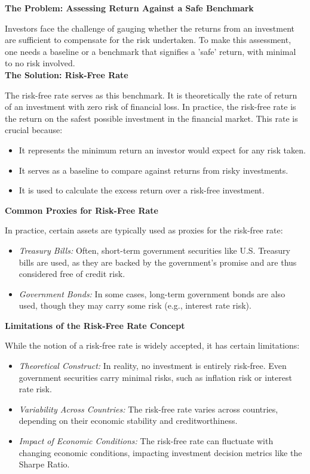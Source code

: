 \documentclass{article}
\begin{document}
\textbf{The Problem: Assessing Return Against a Safe Benchmark}

Investors face the challenge of gauging whether the returns from an investment are sufficient to compensate for the risk undertaken. To make this assessment, one needs a baseline or a benchmark that signifies a 'safe' return, with minimal to no risk involved. \\

\textbf{The Solution: Risk-Free Rate}

The risk-free rate serves as this benchmark. It is theoretically the rate of return of an investment with zero risk of financial loss. In practice, the risk-free rate is the return on the safest possible investment in the financial market. This rate is crucial because:

\begin{itemize}
    \item It represents the minimum return an investor would expect for any risk taken.
    \item It serves as a baseline to compare against returns from risky investments.
    \item It is used to calculate the excess return over a risk-free investment.
\end{itemize}

\textbf{Common Proxies for Risk-Free Rate}

In practice, certain assets are typically used as proxies for the risk-free rate:

\begin{itemize}
    \item \textit{Treasury Bills:} Often, short-term government securities like U.S. Treasury bills are used, as they are backed by the government's promise and are thus considered free of credit risk.
    \item \textit{Government Bonds:} In some cases, long-term government bonds are also used, though they may carry some risk (e.g., interest rate risk).
\end{itemize}

\textbf{Limitations of the Risk-Free Rate Concept}

While the notion of a risk-free rate is widely accepted, it has certain limitations:

\begin{itemize}
    \item \textit{Theoretical Construct:} In reality, no investment is entirely risk-free. Even government securities carry minimal risks, such as inflation risk or interest rate risk.
    \item \textit{Variability Across Countries:} The risk-free rate varies across countries, depending on their economic stability and creditworthiness.
    \item \textit{Impact of Economic Conditions:} The risk-free rate can fluctuate with changing economic conditions, impacting investment decision metrics like the Sharpe Ratio.
\end{itemize}
\end{document}
